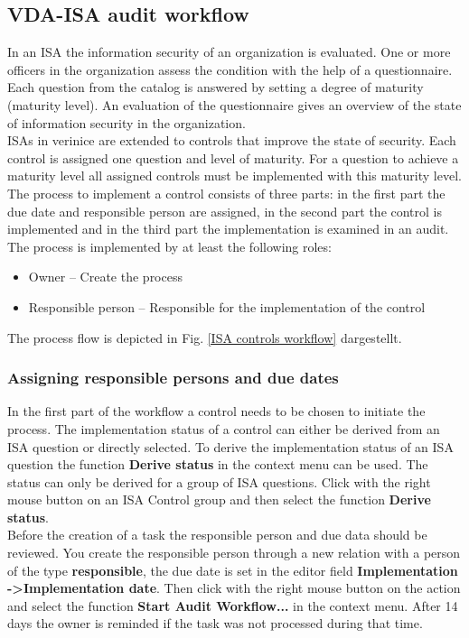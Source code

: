 \documentclass[a4paper,10pt]{book}
\begin{document}
\subsection{VDA-ISA audit workflow}
In an ISA the information security of an organization is evaluated.
One or more officers in the organization assess the condition with the help of a questionnaire. Each question from the catalog is answered by setting a degree of maturity (maturity level). An evaluation of the questionnaire gives an overview of the state of information security in the organization.
\newline\\
ISAs in verinice are extended to controls that improve the state of security. Each control is assigned one question and level of maturity. For a question to achieve a maturity level all assigned controls must be implemented with this maturity level.
\newline\\
The process to implement a control consists of three parts: in the first part the due date and responsible person are assigned, in the second part the control is implemented and in the third part the implementation is examined in an audit. The process is implemented by at least the following roles:
\begin{itemize}
\item Owner – Create the process
\item Responsible person – Responsible for the implementation of the control
\end{itemize}
The process flow is depicted in Fig. \ref{ISA controls workflow} dargestellt.

\subsubsection{Assigning responsible persons and due dates}
In the first part of the workflow a control needs to be chosen to initiate the process. The implementation status of a control can either be derived from an ISA question or directly selected. To derive the implementation status of an ISA question the function \textbf{Derive status} in the context menu can be used. The status can only be derived for a group of ISA questions. Click with the right mouse button on an ISA Control group and then select the function  \textbf{Derive status}.
\newline\\
Before the creation of a task the responsible person and due data should be reviewed. You create the responsible person through a new relation with a person of the type \textbf{responsible}, the due date is set in the editor field \textbf{Implementation -\textgreater Implementation date}. Then click with the right mouse button on the action and select the function \textbf{Start Audit Workflow...} in the context menu.
After 14 days the owner is reminded if the task was not processed during that time.
\end{document}
